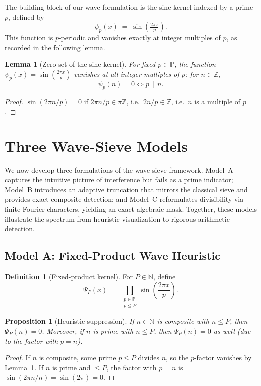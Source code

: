 \documentclass[12pt]{article}
\newtheorem{lemma}{Lemma}
\newtheorem{proposition}{Proposition}
\theoremstyle{definition}
\newtheorem{definition}{Definition}
\theoremstyle{remark}
\newcommand{\N}{\mathbb{N}}
\newcommand{\Z}{\mathbb{Z}}
\newcommand{\Primes}{\mathbb{P}}
\newcommand{\divides}{\,\mid\,}
\begin{document}
The building block of our wave formulation is the sine kernel indexed by a prime $p$, defined by
\[
\psi_p(x) \;=\; \sin\!\left(\tfrac{2\pi x}{p}\right).
\]
This function is $p$-periodic and vanishes exactly at integer multiples of $p$, as recorded in the following lemma.

\begin{lemma}[Zero set of the sine kernel]\label{lem:sine-zero}
For fixed $p\in\Primes$, the function $\psi_p(x)=\sin\!\left(\tfrac{2\pi x}{p}\right)$ vanishes at all integer multiples of $p$: for $n\in\Z$,
\[
\psi_p(n)=0 \iff p \divides n.
\]
\end{lemma}
\begin{proof}
$\sin(2\pi n/p)=0$ if $2\pi n/p \in \pi\Z$, i.e.\ $2n/p \in \Z$, i.e.\ $n$ is a multiple of $p$.
\end{proof}

\section{Three Wave-Sieve Models}\label{sec:models}

We now develop three formulations of the wave-sieve framework. Model~A captures the intuitive picture of interference but fails as a prime indicator; Model~B introduces an adaptive truncation that mirrors the classical sieve and provides exact composite detection; and Model~C reformulates divisibility via finite Fourier characters, yielding an exact algebraic mask. Together, these models illustrate the spectrum from heuristic visualization to rigorous arithmetic detection.

\subsection{Model A: Fixed-Product Wave Heuristic}

\begin{definition}[Fixed-product kernel]
For \(P\in\N\), define
\[
  \Psi_P(x)\;=\; \prod_{\substack{p\in\Primes\\ p\le P}} \sin\!\left(\frac{2\pi x}{p}\right).
\]
\end{definition}

\begin{proposition}[Heuristic suppression]\label{prop:heuristic}
If \(n\in\N\) is composite with \(n\le P\), then \(\Psi_P(n)=0\). Moreover, if \(n\) is prime with \(n\le P\), then \(\Psi_P(n)=0\) as well (due to the factor with \(p=n\)).
\end{proposition}
\begin{proof}
If \(n\) is composite, some prime \(p\le P\) divides \(n\), so the \(p\)-factor vanishes by Lemma~\ref{lem:sine-zero}. If \(n\) is prime and \(\le P\), the factor with \(p=n\) is \(\sin(2\pi n/n)=\sin(2\pi)=0\).
\end{proof}
\end{document}
